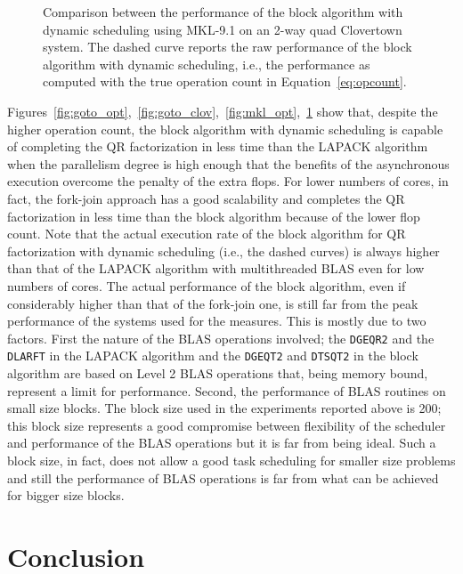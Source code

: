 \documentclass[runningheads]{llncs}
\begin{document}
\begin{figure}
\begin{minipage}[tr]{0.5\textwidth}
\begin{center}
\end{center}
\end{minipage}
\caption{\label{fig:mkl_clov}Comparison between the performance of the
block algorithm with dynamic scheduling using MKL-9.1 on an
2-way quad Clovertown system. The dashed curve reports the
raw performance of the block algorithm with dynamic scheduling, i.e.,
the performance as computed with the true operation count in Equation~\eqref{eq:opcount}.}
\end{figure}

Figures~\ref{fig:goto_opt},~\ref{fig:goto_clov},~\ref{fig:mkl_opt},~\ref{fig:mkl_clov}
show that, despite the higher operation count, the block algorithm
with dynamic scheduling is capable of completing the QR
factorization in less time than the LAPACK algorithm when the
parallelism degree is high enough that the benefits of the
asynchronous execution overcome the penalty of the extra flops. For
lower numbers of cores, in fact, the fork-join approach has a good
scalability and completes the QR factorization in less time than the
block algorithm because of the lower flop count. Note that the
actual execution rate of the block algorithm for QR factorization with dynamic
scheduling (i.e., the dashed curves) is always higher than that of the
LAPACK algorithm with multithreaded BLAS even for low numbers of cores.
The actual performance of the block algorithm, even if considerably
higher than that of the fork-join one, is still far from the peak
performance of the systems used for the measures. This is mostly due
to two factors. First the nature of the BLAS operations involved;
the \texttt{DGEQR2} and the \texttt{DLARFT} in the LAPACK algorithm
and the \texttt{DGEQT2} and \texttt{DTSQT2} in the block algorithm are
based on Level 2 BLAS operations that, being memory bound, represent a limit
for performance. Second, the performance of BLAS routines on small
size blocks. The block size used in the experiments reported above is
200; this block size represents a good compromise between flexibility
of the scheduler and performance of the BLAS operations but it is far
from being ideal. Such a block size, in fact, does not allow a good
task scheduling for smaller size problems and still the performance of
BLAS operations is far from what can be achieved for bigger size blocks.

\section{Conclusion}
\label{sec:future}
\end{document}
